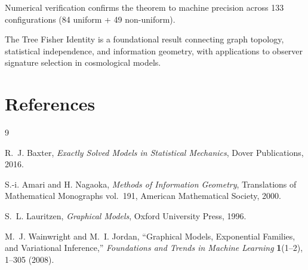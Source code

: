 \documentclass[11pt]{article}
\theoremstyle{definition}
\theoremstyle{remark}
\begin{document}
Numerical verification confirms the theorem to machine precision across
133 configurations (84 uniform + 49 non-uniform).

The Tree Fisher Identity is a foundational result connecting graph
topology, statistical independence, and information geometry, with
applications to observer signature selection in cosmological models.

\section*{References}

\begin{thebibliography}{9}

R.~J. Baxter, \emph{Exactly Solved Models in Statistical Mechanics},
Dover Publications, 2016.

S.-i. Amari and H. Nagaoka, \emph{Methods of Information Geometry},
Translations of Mathematical Monographs vol.~191, American Mathematical
Society, 2000.

S.~L. Lauritzen, \emph{Graphical Models}, Oxford University Press, 1996.

M.~J. Wainwright and M.~I. Jordan, ``Graphical Models, Exponential Families,
and Variational Inference,'' \emph{Foundations and Trends in Machine Learning}
\textbf{1}(1--2), 1--305 (2008).

\end{thebibliography}
\end{document}
